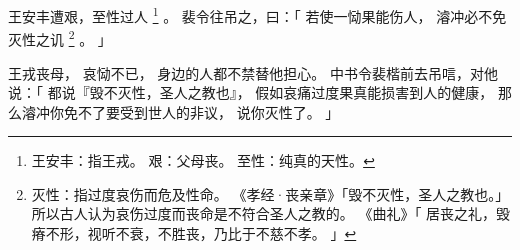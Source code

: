 
\switchcolumn*[\section{}]

王安丰遭艰，至性过人%
\footnote{%
    王安丰：指王戎。
    艰：父母丧。
    至性：纯真的天性。
}%
。
裴令往吊之，曰：「
    若使一恸果能伤人，
    濬冲必不免灭性之讥%
    \footnote{%
        灭性：指过度哀伤而危及性命。
              《孝经·丧亲章》「毁不灭性，圣人之教也。」
              所以古人认为哀伤过度而丧命是不符合圣人之教的。
              《曲礼》「
                  居丧之礼，毁瘠不形，视听不衰，不胜丧，乃比于不慈不孝。
              」
    }%
    。
」

\switchcolumn

王戎丧母，
哀恸不已，
身边的人都不禁替他担心。
中书令裴楷前去吊唁，对他说：「
    都说『毁不灭性，圣人之教也』，
    假如哀痛过度果真能损害到人的健康，
    那么濬冲你免不了要受到世人的非议，
    说你灭性了。
」
